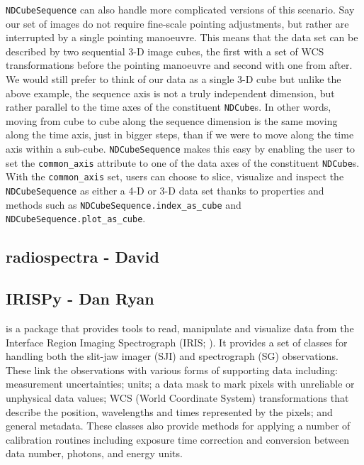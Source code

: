 \texttt{NDCubeSequence} can also handle more complicated versions of this scenario.
Say our set of images do not require fine-scale pointing adjustments, but rather are interrupted by a single pointing manoeuvre.  This means that the data set can be described by two sequential 3-D image cubes, the first with a set of WCS transformations before the pointing manoeuvre and second with one from after.
We would still prefer to think of our data as a single 3-D cube but unlike the above example, the sequence axis is not a truly independent dimension, but rather parallel to the time axes of the constituent \texttt{NDCube}s.
In other words, moving from cube to cube along the sequence dimension is the same moving along the time axis, just in bigger steps, than if we were to move along the time axis within a sub-cube.
\texttt{NDCubeSequence} makes this easy by enabling the user to set the \texttt{common\_axis} attribute to one of the data axes of the constituent \texttt{NDCube}s.
With the \texttt{common\_axis} set, users can choose to slice, visualize and inspect the \texttt{NDCubeSequence} as either a 4-D or 3-D data set thanks to properties and methods such as \texttt{NDCubeSequence.index\_as\_cube} and \texttt{NDCubeSequence.plot\_as\_cube}.


\subsection{radiospectra - David}


\subsection{IRISPy - Dan Ryan}
 is a package that provides tools to read, manipulate and visualize data from the Interface Region Imaging Spectrograph (IRIS; \citealt{DePontieu2014}). It provides a set of classes for handling both the slit-jaw imager (SJI) and spectrograph (SG) observations. These link the observations with various forms of supporting data including: measurement uncertainties; units; a data mask to mark pixels with unreliable or unphysical data values; WCS (World Coordinate System) transformations that describe the position, wavelengths and times represented by the pixels; and general metadata. These classes also provide methods for applying a number of calibration routines including exposure time correction and conversion between data number, photons, and energy units. 

